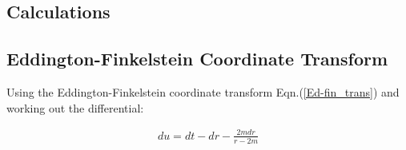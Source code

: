 \begin{appendix}

\section{Calculations}

\subsection{Eddington-Finkelstein Coordinate Transform}\label{Appendix_Ed-Fin_trans}

Using the Eddington-Finkelstein coordinate transform Eqn.(\ref{Ed-fin_trans}) and working out the differential:

\begin{eqnarray*}
du = dt - dr - \frac{2m dr}{r - 2m}
\end{eqnarray*}

\end{appendix}
